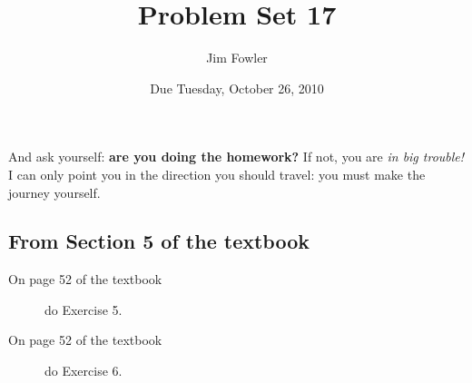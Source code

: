 \documentclass[12pt]{handout}
\author{Jim Fowler}
\title{Problem Set 17}
\date{Due Tuesday, October 26, 2010}
\begin{document}
\maketitle


And ask yourself: \textbf{are you doing the homework?}  If not, you are \textit{in big trouble!}  I can only point you in the direction you should travel: you must make the journey yourself.









\subsection*{From Section 5 of the textbook}



\begin{description}

\item[On page 52 of the textbook] do Exercise 5.

\item[On page 52 of the textbook] do Exercise 6.

\end{description}
\end{document}

